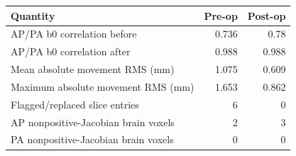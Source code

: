 \begin{tabular}{lrr}
\toprule
Quantity & Pre-op & Post-op \\
\midrule
AP/PA b0 correlation before & 0.736 & 0.78 \\
AP/PA b0 correlation after & 0.988 & 0.988 \\
Mean absolute movement RMS (mm) & 1.075 & 0.609 \\
Maximum absolute movement RMS (mm) & 1.653 & 0.862 \\
Flagged/replaced slice entries & 6 & 0 \\
AP nonpositive-Jacobian brain voxels & 2 & 3 \\
PA nonpositive-Jacobian brain voxels & 0 & 0 \\
\bottomrule
\end{tabular}
